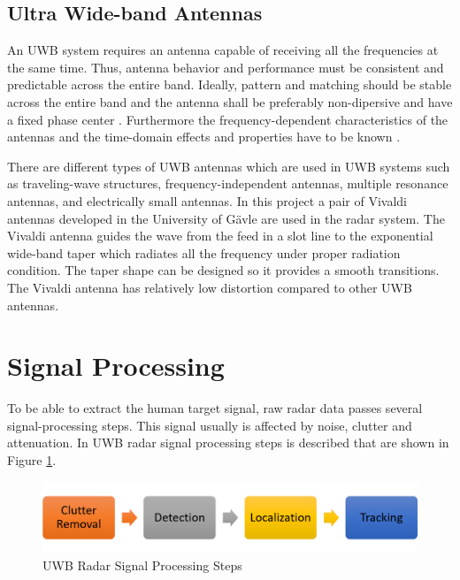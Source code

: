 \subsection{Ultra Wide-band Antennas}
An UWB system requires an antenna capable of receiving all the frequencies at the same time. Thus, antenna behavior and performance must be consistent and predictable across the entire band. Ideally, pattern and matching should be stable across the entire band and the antenna shall be preferably non-dipersive and have a fixed phase center \cite{SchantzUWBAntenna}. Furthermore the frequency-dependent characteristics of the antennas and the time-domain effects and properties have to be known \cite{WiesbeckUWBAntenna}.

There are different types of UWB antennas which are used in UWB systems such as  traveling-wave structures, frequency-independent antennas,  multiple resonance antennas, and electrically small antennas.
In this project a pair of Vivaldi antennas developed in the University of G{\"a}vle are used in the radar system. The Vivaldi antenna guides the wave from the feed in a slot line to the exponential wide-band taper which radiates all the frequency under proper radiation condition. The taper shape can be designed so it provides a smooth transitions. The Vivaldi antenna has relatively low distortion compared to other UWB antennas. 

\section{Signal Processing}
To be able to extract the human target signal, raw radar data passes several signal-processing steps. This signal usually is affected by noise, clutter and attenuation. %
In \cite{RovnakovaSignalProcessing} UWB radar signal processing steps is described that are shown in Figure \ref{fig:SignalProcessing}.
\begin{figure}
  \centering
  \includegraphics[width=\textwidth]{Figures/SignalProcessingSteps.png}
  \caption{UWB Radar Signal Processing Steps}
  \label{fig:SignalProcessing}
\end{figure}

